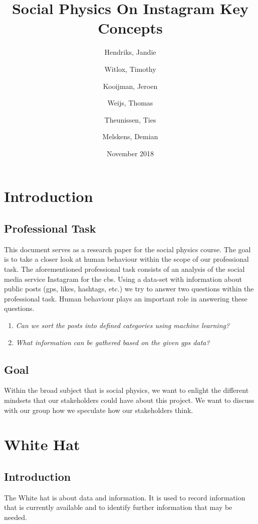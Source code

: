 \documentclass{article}
\title{Social Physics On Instagram Key Concepts}
\author{
  Hendriks, Jandie\\
  \and
  Witlox, Timothy\\
  \and
  Kooijman, Jeroen\\
  \and
  Weijs, Thomas\\
  \and
  Theunissen, Ties\\
  \and
  Melskens, Demian\\
}
\date{November 2018}
\begin{document}
\maketitle
{}
\pagebreak

\tableofcontents
\pagebreak
{}

\section{Introduction}
    \subsection{Professional Task}
        This document serves as a research paper for the social physics course. The goal is to take a closer look at human behaviour within the scope of our professional task. The aforementioned professional task consists of an analysis of the social media service Instagram for the \gls{cbs}. Using a data-set with information about public posts (\gls{gps}, likes, hashtags, etc.) we try to answer two questions within the professional task. Human behaviour plays an important role in answering these questions. 
    
    \begin{enumerate}
    	\item \textit{Can we sort the posts into defined categories using machine learning?}
    	\item \textit{What information can be gathered based on the given \gls{gps} data?}
    \end{enumerate}
    
    \subsection{Goal}
        Within the broad subject that is social physics, we want to enlight the different mindsets that our stakeholders could have about this project. We want to discuss with our group how we speculate how our stakeholders think.
\pagebreak

\section{White Hat}
    \subsection{Introduction}
        The White hat is about data and information. It is used to record information that is currently available and to identify further information that may be needed.
    
\end{document}
